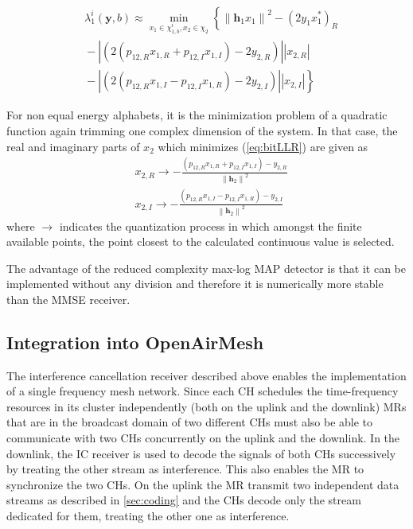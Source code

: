 \documentclass[a4paper,twocolumn,journal]{IEEEtran}
\begin{document}
\begin{align}
&\lambda^{i}_{1}\left(\textbf{y},b\right)\approx\min_{x_{1}\in\chi^{i}_{1,b},x_{2}\in\chi_{2}}\left\{\left\|\textbf{h}_{1}x_{1}\right\|^{2}-\left(2y_{1}x_{1}^{*}\right)_{R}\right.\nonumber\\
&\!-\!\left|\left(2\left(p_{12,R}x_{1,R}\!+\!p_{12,I}x_{1,I}\!\right)\!-\!2 y_{2,R}\!\right)\right|\left|x_{2,R}\right|\nonumber\\
&\left.\!-\!\left|\left(2\left(p_{12,R}x_{1,I}\!-\!p_{12,I}x_{1,R}\!\right)\!-\!2 y_{2,I}\!\right)\right|\left|x_{2,I}\right|\right\}\label{eq:MAP3e}
\end{align}

For non equal energy alphabets, it is the minimization problem of a quadratic function again trimming one complex dimension of the system. In that case, the real and imaginary parts of $x_{2}$ which minimizes (\ref{eq:bitLLR}) are given as
\begin{align}
&x_{2,R}\rightarrow-\frac{\left(p_{12,R}x_{1,R}+p_{12,I}x_{1,I}\right)- y_{2,R}}{\left\|\textbf{h}_{2}\right\|^{2}}\nonumber\\
&x_{2,I}\rightarrow-\frac{\left(p_{12,R}x_{1,I}\!-\!p_{12,I}x_{1,R}\!\right)\!-\! y_{2,I}}{\left\|\textbf{h}_{2}\right\|^{2}}
\end{align}
where $\rightarrow$ indicates the quantization process in which amongst the finite available points, the point closest to the calculated continuous value is selected.


The advantage of the reduced complexity max-log MAP detector is that it can be implemented without any division and therefore it is numerically more stable than the MMSE receiver. 

\subsection{Integration into OpenAirMesh}

The interference cancellation receiver described above enables the implementation of a single frequency mesh network. Since each CH schedules the time-frequency resources in its cluster independently (both on the uplink and the downlink) MRs that are in the broadcast domain of two different CHs must also be able to communicate with two CHs concurrently on the uplink and the downlink. In the downlink, the IC receiver is used to decode the signals of both CHs successively by treating the other stream as interference. This also enables the MR to synchronize the two CHs. On the uplink the MR transmit two independent data streams as described in \ref{sec:coding} and the CHs decode only the stream dedicated for them, treating the other one as interference. 
\end{document}
